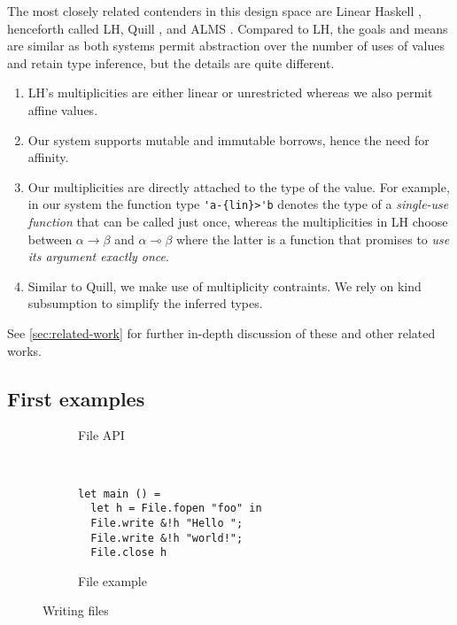 The most closely related contenders in this design space are Linear Haskell
\cite{DBLP:journals/pacmpl/BernardyBNJS18}, henceforth called LH,
Quill \cite{DBLP:conf/icfp/Morris16}, and ALMS \cite{DBLP:conf/popl/TovP11}.
Compared to LH, the goals and means are
similar as both systems permit abstraction over the number of uses of
values and retain type inference, but the details are quite different.
\begin{enumerate}
\item LH's multiplicities are either linear or unrestricted whereas
  we also permit affine values.
\item Our system supports mutable and immutable borrows, hence the
  need for affinity.
\item Our multiplicities are directly attached to the type of the
  value. For example, in our system the function type \lstinline/'a-{lin}>'b/
  denotes the type of a \emph{single-use function} that can be called
  just once, whereas the multiplicities in LH choose
  between $\alpha\to\beta$ and $\alpha \multimap\beta$ where the
  latter is a function that promises to \emph{use its argument exactly
    once}.
\item Similar to Quill, we make use of multiplicity contraints. We
  rely on kind subsumption to simplify the inferred types.
\end{enumerate}
See \cref{sec:related-work} for further in-depth discussion of these
and other related works.
\subsection{First examples}
\label{sec:first-example}
\begin{figure}[tp]
  \begin{subfigure}[t]{0.45\linewidth}
    
    \caption{File API}
    \label{fig:writing-files-api}
  \end{subfigure}
  ~
  \begin{subfigure}[t]{0.45\linewidth}
\begin{lstlisting}
let main () =
  let h = File.fopen "foo" in
  File.write &!h "Hello ";
  File.write &!h "world!";
  File.close h
\end{lstlisting}
    \caption{File example}
    \label{fig:writing-files-example}
  \end{subfigure}
  \caption{Writing files}
  \label{fig:writing-fiules}
\end{figure}


